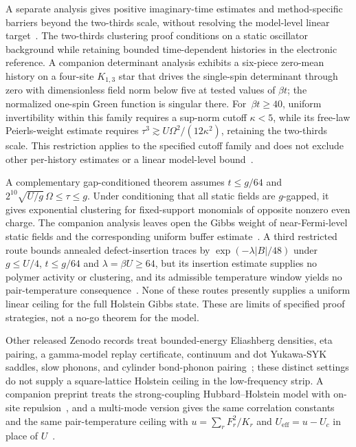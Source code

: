 \documentclass[11pt]{article}
\begin{document}
A separate analysis gives positive imaginary-time estimates and method-specific barriers beyond the two-thirds scale, without resolving the model-level linear target~\cite{linear5}. The two-thirds clustering proof conditions on a static oscillator background while retaining bounded time-dependent histories in the electronic reference. A companion determinant analysis exhibits a six-piece zero-mean history on a four-site $K_{1,3}$ star that drives the single-spin determinant through zero with dimensionless field norm below five at tested values of $\beta t$; the normalized one-spin Green function is singular there. For~\mbox{$\beta t\geq40$}, uniform invertibility within this family requires a sup-norm cutoff $\kappa<5$, while its free-law Peierls-weight estimate requires $\tau^3\gtrsim U\Omega^2/(12\kappa^2)$, retaining the two-thirds scale. This restriction applies to the specified cutoff family and does not exclude other per-history estimates or a linear model-level bound~\cite{barriers}.

A complementary gap-conditioned theorem assumes $t\leq g/64$ and $2^{10}\sqrt{U/g}\,\Omega\leq\tau\leq g$. Under conditioning that all static fields are $g$-gapped, it gives exponential clustering for fixed-support monomials of opposite nonzero even charge. The companion analysis leaves open the Gibbs weight of near-Fermi-level static fields and the corresponding uniform buffer estimate~\cite{barriers}. A third restricted route bounds annealed defect-insertion traces by $\exp(-\lambda|B|/48)$ under $g\leq U/4$, $t\leq g/64$ and $\lambda=\beta U\geq64$, but its insertion estimate supplies no polymer activity or clustering, and its admissible temperature window yields no pair-temperature consequence~\cite{limits}. None of these routes presently supplies a uniform linear ceiling for the full Holstein Gibbs state. These are limits of specified proof strategies, not a no-go theorem for the model.

Other released Zenodo records treat bounded-energy Eliashberg densities, eta pairing, a gamma-model replay certificate, continuum and dot Yukawa-SYK saddles, slow phonons, and cylinder bond-phonon pairing~\cite{finiteband,etapair,gamma,yukawacont,slowphonon,linear3,yukawadot}; these distinct settings do not supply a square-lattice Holstein ceiling in the low-frequency strip. A companion preprint treats the strong-coupling Hubbard--Holstein model with on-site repulsion~\cite{hubhol}, and a multi-mode version gives the same correlation constants and the same pair-temperature ceiling with $u=\sum_r F_r^2/K_r$ and $U_{\mathrm{eff}}=u-U_c$ in place of $U$~\cite{exthol}.
\end{document}

